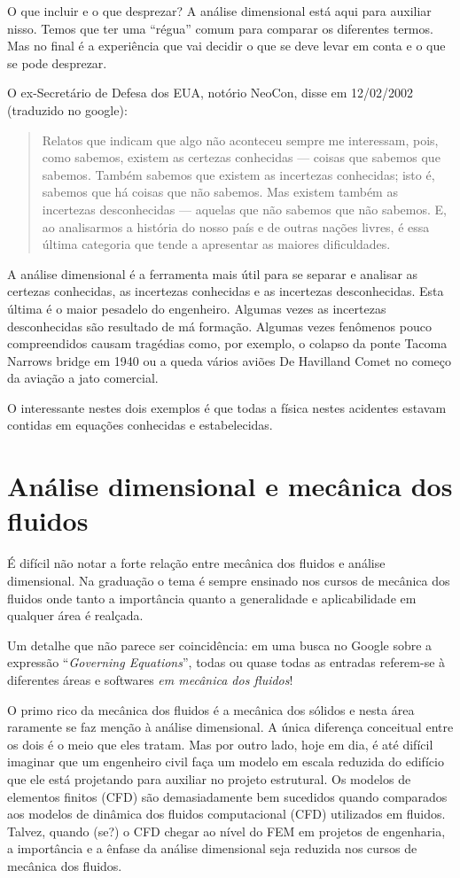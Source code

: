 O que incluir e o que desprezar? A análise dimensional está aqui para auxiliar nisso. Temos que ter uma ``régua'' comum para comparar os diferentes termos. Mas no final é a experiência que vai decidir o que se deve levar em conta e o que se pode desprezar.


O ex-Secretário de Defesa dos EUA, notório NeoCon, disse em 12/02/2002 (traduzido no google):
\begin{quote}
  Relatos que indicam que algo não aconteceu sempre me interessam, pois, como sabemos, existem as certezas conhecidas — coisas que sabemos que sabemos. Também sabemos que existem as incertezas conhecidas; isto é, sabemos que há coisas que não sabemos. Mas existem também as incertezas desconhecidas — aquelas que não sabemos que não sabemos. E, ao analisarmos a história do nosso país e de outras nações livres, é essa última categoria que tende a apresentar as maiores dificuldades.
\end{quote}

A análise dimensional é a ferramenta mais útil para se separar e analisar as certezas conhecidas, as incertezas conhecidas e as incertezas desconhecidas. Esta última é o maior pesadelo do engenheiro. Algumas vezes as incertezas desconhecidas são resultado de má formação. Algumas vezes fenômenos pouco compreendidos causam tragédias como, por exemplo, o colapso da ponte Tacoma Narrows bridge em 1940 ou a queda vários aviões De Havilland Comet no começo da aviação a jato comercial.

O interessante nestes dois exemplos é que todas a física nestes acidentes estavam contidas em equações conhecidas e estabelecidas. 

\section{Análise dimensional e mecânica dos fluidos}
É difícil não notar a forte relação entre mecânica dos fluidos e análise dimensional. Na graduação o tema é sempre ensinado nos cursos de mecânica dos fluidos onde tanto a importância quanto a generalidade e aplicabilidade em qualquer área é realçada.

Um detalhe que não parece ser coincidência: em uma busca no Google sobre a expressão ``\emph{Governing Equations}'', todas ou quase todas as entradas referem-se à diferentes áreas e softwares \emph{em mecânica dos fluidos}!

O primo rico da mecânica dos fluidos é a mecânica dos sólidos e nesta área raramente se faz menção à análise dimensional. A única diferença conceitual entre os dois é o meio que eles tratam. Mas por outro lado, hoje em dia, é até difícil imaginar que um engenheiro civil faça um modelo em escala reduzida do edifício que ele está projetando para auxiliar no projeto estrutural. Os modelos de elementos finitos (CFD) são demasiadamente bem sucedidos quando comparados aos modelos de dinâmica dos fluidos computacional (CFD) utilizados em fluidos. Talvez, quando (se?) o CFD chegar ao nível do FEM em projetos de engenharia, a importância e a ênfase da análise dimensional seja reduzida nos cursos de mecânica dos fluidos. 

